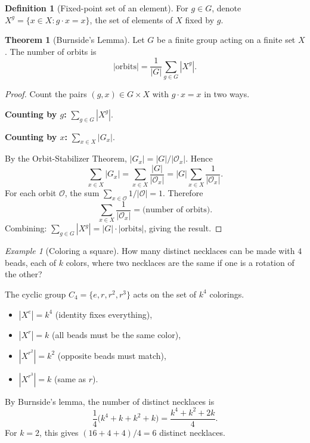 \documentclass[12pt,a4paper,openany]{book}
\theoremstyle{definition}
\newtheorem{definition}{Definition}[chapter]
\newtheorem{theorem}{Theorem}[chapter]
\theoremstyle{remark}
\newtheorem{example}{Example}[chapter]
\begin{document}
\begin{definition}[Fixed-point set of an element]\label{def:fix-element}
For $g\in G$, denote $X^g=\{x\in X : g\cdot x=x\}$, the set of
elements of $X$ fixed by $g$.
\end{definition}

\begin{theorem}[Burnside's Lemma]\label{thm:burnside}
Let $G$ be a finite group acting on a finite set $X$.  The number
of orbits is
\[
   |\text{orbits}| = \frac{1}{|G|}\sum_{g\in G} |X^g|.
\]
\end{theorem}

\begin{proof}
Count the pairs $(g,x)\in G\times X$ with $g\cdot x=x$ in two ways.

\textbf{Counting by $g$:}
$\displaystyle\sum_{g\in G} |X^g|$.

\textbf{Counting by $x$:}
$\displaystyle\sum_{x\in X} |G_x|$.

By the Orbit-Stabilizer Theorem, $|G_x| = |G|/|\mathcal{O}_x|$.  Hence
\[
   \sum_{x\in X} |G_x|
   = \sum_{x\in X} \frac{|G|}{|\mathcal{O}_x|}
   = |G|\sum_{x\in X}\frac{1}{|\mathcal{O}_x|}.
\]
For each orbit $\mathcal{O}$, the sum
$\sum_{x\in\mathcal{O}} 1/|\mathcal{O}| = 1$.  Therefore
\[
   \sum_{x\in X}\frac{1}{|\mathcal{O}_x|}
   = \text{(number of orbits)}.
\]
Combining:
$\sum_{g\in G}|X^g| = |G|\cdot|\text{orbits}|$, giving the result.
\end{proof}

\begin{example}[Coloring a square]\label{ex:burnside-square}
How many distinct necklaces can be made with $4$ beads, each of $k$
colors, where two necklaces are the same if one is a rotation of
the other?

The cyclic group $C_4=\{e,r,r^2,r^3\}$ acts on the set of
$k^4$ colorings.
\begin{itemize}
\item $|X^e|=k^4$ (identity fixes everything),
\item $|X^r|=k$ (all beads must be the same color),
\item $|X^{r^2}|=k^2$ (opposite beads must match),
\item $|X^{r^3}|=k$ (same as $r$).
\end{itemize}
By Burnside's lemma, the number of distinct necklaces is
\[
   \frac{1}{4}\bigl(k^4+k+k^2+k\bigr) = \frac{k^4+k^2+2k}{4}.
\]
For $k=2$, this gives $(16+4+4)/4=6$ distinct necklaces.
\end{example}
\end{document}
